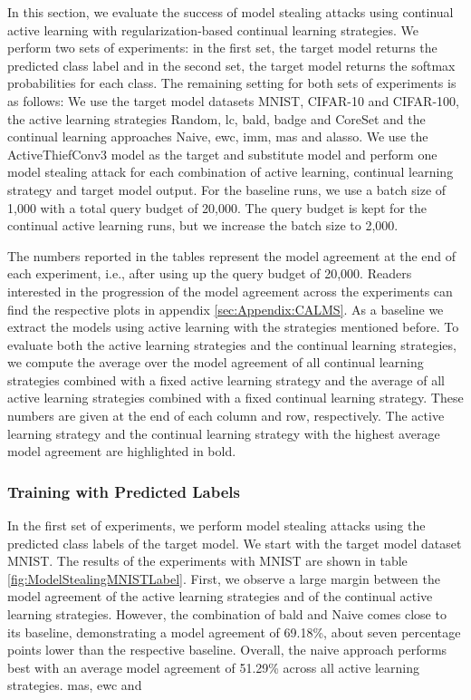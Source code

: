 In this section, we evaluate the success of model stealing attacks using continual active learning with regularization-based continual learning strategies. 
We perform two sets of experiments: in the first set, the target model returns the predicted class label and in the second set, the target model returns the
softmax probabilities for each class. The remaining setting for both sets of experiments is as follows: We use the target model datasets MNIST, CIFAR-10 and CIFAR-100,
the active learning strategies Random, \gls{lc}, \gls{bald}, \gls{badge} and CoreSet and the continual learning approaches Naive, \gls{ewc}, \gls{imm}, \gls{mas} and
\gls{alasso}. We use the ActiveThiefConv3 model as the target and substitute model and perform one model stealing attack for each combination of active learning,
continual learning strategy and target model output. For the baseline runs, we use a batch size of 1,000 with a total query budget of 20,000. The query budget is kept
for the continual active learning runs, but we increase the batch size to 2,000. \par
The numbers reported in the tables represent the model agreement at the end of each experiment, i.e., after using up the query budget of 20,000. Readers interested
in the progression of the model agreement across the experiments can find the respective plots in appendix \ref{sec:Appendix:CALMS}. As a baseline we extract the models
using active learning with the strategies mentioned before. To evaluate both the active learning strategies and the continual learning strategies, we compute the average
over the model agreement of all continual learning strategies combined with a fixed active learning strategy and the average of all active learning strategies combined
with a fixed continual learning strategy. These numbers are given at the end of each column and row, respectively. The active learning strategy and the continual
learning strategy with the highest average model agreement are highlighted in bold. \par


\subsubsection{Training with Predicted Labels}
\label{sec:Evaluation:MS:Regularization:Predicted}

In the first set of experiments, we perform model stealing attacks using the predicted class labels of the target model. We start with the target model dataset MNIST. 
The results of the experiments with MNIST are shown in table \ref{fig:ModelStealingMNISTLabel}. First, we observe a large margin between the model agreement
of the active learning strategies and of the continual active learning strategies. However, the combination of \gls{bald} and Naive comes close to
its baseline, demonstrating a model agreement of 69.18\%, about seven percentage points lower than the respective baseline. Overall, the naive approach performs
best with an average model agreement of 51.29\% across all active learning strategies. \gls{mas}, \gls{ewc} and \gls{}

